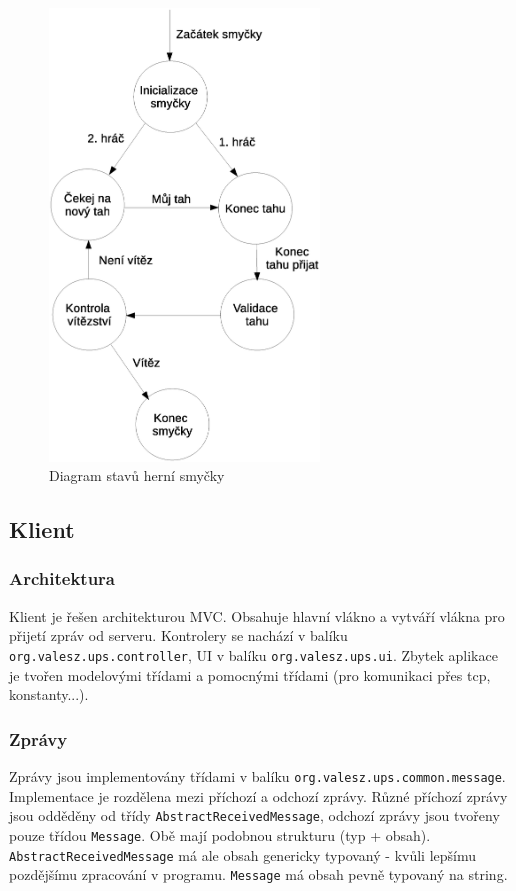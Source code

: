 \documentclass[11pt,a4paper]{scrartcl}
\begin{document}
	\begin{figure}[H]
		\centering
		\includegraphics[height=12cm]{server_h_smycka.eps}
		\caption{Diagram stavů herní smyčky}
	\end{figure}
	
	\subsection{Klient}
	\subsubsection{Architektura}
	Klient je řešen architekturou MVC. Obsahuje hlavní vlákno a vytváří vlákna pro přijetí zpráv od serveru. Kontrolery se nachází v balíku \verb|org.valesz.ups.controller|, UI v balíku \verb|org.valesz.ups.ui|. Zbytek aplikace je tvořen modelovými třídami a pomocnými třídami (pro komunikaci přes tcp, konstanty...).
	
	\subsubsection{Zprávy}
	Zprávy jsou implementovány třídami v balíku \verb|org.valesz.ups.common.message|. Implementace je rozdělena mezi příchozí a odchozí zprávy. Různé příchozí zprávy jsou odděděny od třídy \verb|AbstractReceivedMessage|, odchozí zprávy jsou tvořeny pouze třídou \verb|Message|. Obě mají podobnou strukturu (typ + obsah). \verb|AbstractReceivedMessage| má ale obsah genericky typovaný - kvůli lepšímu pozdějšímu zpracování v programu. \verb|Message| má obsah pevně typovaný na string.
	
\end{document}
